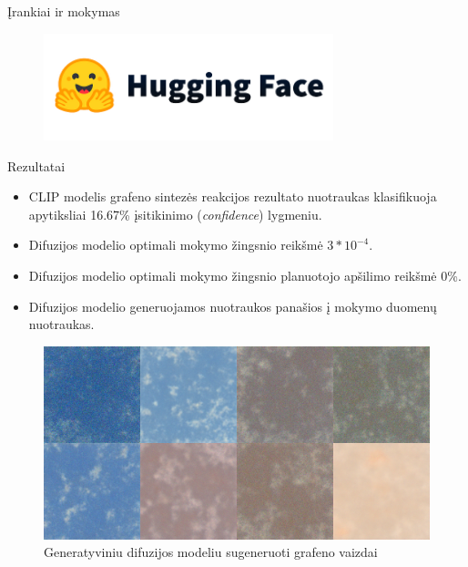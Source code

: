 \begin{frame}[c]{Įrankiai ir mokymas}
\begin{minipage}[t]{0.29\textwidth}
\begin{figure}
        \end{figure}
        \begin{figure}
            \centering
            \includegraphics[width=0.75\textwidth]{img/6308b84661b3e2a522f01468.png}
        \end{figure}
    \end{minipage}
\end{frame}
\begin{frame}[c]{Rezultatai}
    \begin{minipage}[t]{0.49\textwidth}
        \begin{itemize}
            \item CLIP modelis grafeno sintezės reakcijos rezultato nuotraukas klasifikuoja apytiksliai 16.67\% įsitikinimo (\textit{confidence}) lygmeniu.
            \item Difuzijos modelio optimali mokymo žingsnio reikšmė $3 * 10^{-4}$.
            \item Difuzijos modelio optimali mokymo žingsnio planuotojo     apšilimo reikšmė 0\%.
            \item Difuzijos modelio generuojamos nuotraukos panašios į mokymo duomenų nuotraukas.
        \end{itemize}
    \end{minipage}
    \begin{minipage}[t]{0.49\textwidth}
       \begin{figure}
            \includegraphics[width=1\textwidth]{img/graphene-diffuser-inference.png}
            \caption{Generatyviniu difuzijos modeliu sugeneruoti grafeno vaizdai}
        \end{figure}
    \end{minipage}
\end{frame}

